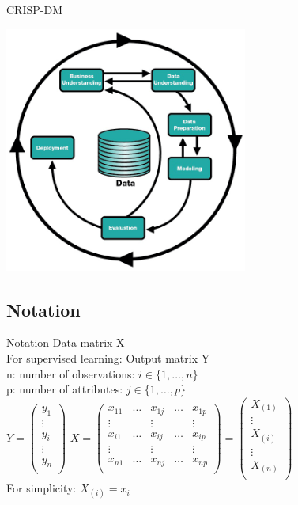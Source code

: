 \documentclass{beamer}
\begin{document}
	\begin{frame}{CRISP-DM}
    \begin{center}
    		\includegraphics[width=0.6\textwidth]{figures/introduction/newcrispdiagram.png}
    \end{center}
	\end{frame}
    

	
	
\subsection{Notation}
	\begin{frame}{Notation}
		Data matrix X \\
        For supervised learning: Output matrix Y \\
        n: number of observations: $i\in\{1,\dots,n\}$ \\ 
        p: number of attributes: $j\in\{1,\dots,p\}$ \\
        \bigskip
        $Y=\begin{pmatrix}
        y_{1} \\
		\vdots \\
        y_{i} \\
        \vdots \\
        y_{n}\\
        \end{pmatrix}$ \qquad  
        $X=\begin{pmatrix}
        x_{11} & \dots & x_{1j} & \dots & x_{1p} \\
		\vdots & {}	   & \vdots & {}    & \vdots \\
        x_{i1} & \dots & x_{ij} & \dots & x_{ip} \\
        \vdots & {}	   & \vdots & {}    & \vdots \\
        x_{n1} & \dots & x_{nj} & \dots & x_{np} \\
        \end{pmatrix}=
        \begin{pmatrix}
        X_{(1)} \\
		\vdots \\
        X_{(i)} \\
        \vdots \\
        X_{(n)}\\
        \end{pmatrix}$  \\
        \bigskip
        For simplicity: $X_{(i)}=x_i$
	\end{frame}
\end{document}
